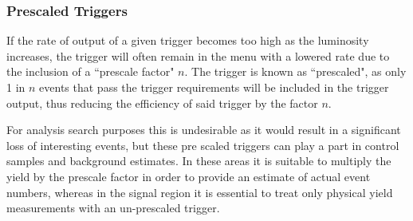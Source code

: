 \subsubsection{Prescaled Triggers}
If the rate of output of a given trigger becomes too high as the luminosity increases, the trigger will often remain in the menu with a lowered rate due to the inclusion of a ``prescale factor" $n$. The trigger is known as ``prescaled", as only 1 in $n$ events that pass the trigger requirements will be included in the trigger output, thus reducing the efficiency of said trigger by the factor $n$. 

For analysis search purposes this is undesirable as it would result in a significant loss of interesting events, but these pre scaled triggers can play a part in control samples and background estimates. In these areas it is suitable to multiply the yield by the prescale factor in order to provide an estimate of actual event numbers, whereas in the signal region it is essential to treat only physical yield measurements with an un-prescaled trigger.


